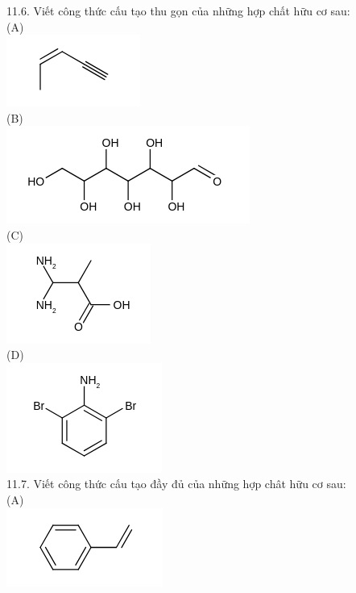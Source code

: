 \documentclass[10pt]{article}
\begin{document}
11.6. Viết công thức cấu tạo thu gọn của những hợp chất hữu cơ sau:\\
(A)\\
\includegraphics{smile-7f96b6606986048787ca66a5185ffbbca308d3f9}\\
(B)\\
\includegraphics{smile-59bbca21a3729b30a5694f7944ccdb025e5e853e}\\
(C)\\
\includegraphics{smile-b032cdebc17ad81538c5a43571ee8ddbc10d20a1}\\
(D)\\
\includegraphics{smile-2f7c596b99451fc46d0efc8ace93e9a9191212ae}\\
11.7. Viết công thức cấu tạo đầy đủ của những hợp chât hữu cơ sau:\\
(A)\\
\includegraphics{smile-06ea6742efa0e8fd680b06e224b98cc666f4b2ab}\\
\end{document}
